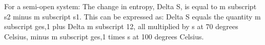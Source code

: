 For a semi-open system:
The change in entropy, Delta S, is equal to m subscript s2 minus m subscript s1. This can be expressed as:
Delta S equals the quantity m subscript ges,1 plus Delta m subscript 12, all multiplied by s at 70 degrees Celsius, minus m subscript ges,1 times s at 100 degrees Celsius.